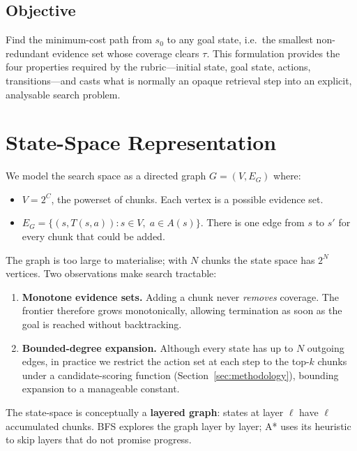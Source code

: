 \documentclass[conference]{IEEEtran}
\begin{document}
\subsection{Objective}

Find the minimum-cost path from $s_0$ to any goal state, i.e.\ the smallest
non-redundant evidence set whose coverage clears $\tau$. This formulation
provides the four properties required by the rubric---initial state, goal
state, actions, transitions---and casts what is normally an opaque retrieval
step into an explicit, analysable search problem.

\section{State-Space Representation}
\label{sec:statespace}

We model the search space as a directed graph $G = (V, E_G)$ where:
\begin{itemize}
  \item $V = 2^C$, the powerset of chunks. Each vertex is a possible evidence
    set.
  \item $E_G = \{(s, T(s,a)) : s \in V,\; a \in A(s)\}$. There is one edge
    from $s$ to $s'$ for every chunk that could be added.
\end{itemize}

The graph is too large to materialise; with $N$ chunks the state space has
$2^N$ vertices. Two observations make search tractable:

\begin{enumerate}
  \item \textbf{Monotone evidence sets.} Adding a chunk never \textit{removes}
    coverage. The frontier therefore grows monotonically, allowing termination
    as soon as the goal is reached without backtracking.
  \item \textbf{Bounded-degree expansion.} Although every state has up to $N$
    outgoing edges, in practice we restrict the action set at each step to the
    top-$k$ chunks under a candidate-scoring function
    (Section~\ref{sec:methodology}), bounding expansion to a manageable
    constant.
\end{enumerate}

The state-space is conceptually a \textbf{layered graph}: states at layer
$\ell$ have $\ell$ accumulated chunks. BFS explores the graph layer by layer;
A* uses its heuristic to skip layers that do not promise progress.
\end{document}
